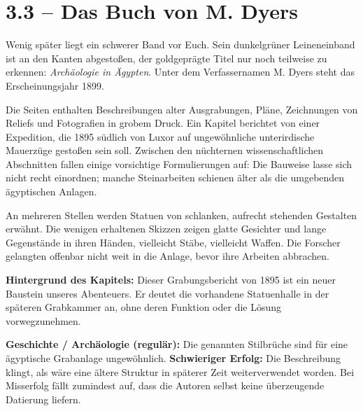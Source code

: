 \section{3.3 -- Das Buch von M. Dyers}
\begin{vorlesetextalle}
Wenig später liegt ein schwerer Band vor Euch. Sein dunkelgrüner Leineneinband ist an den Kanten abgesto\ss{}en, der goldgeprägte Titel nur noch teilweise zu erkennen: \emph{Archäologie in Ägypten}. Unter dem Verfassernamen M. Dyers steht das Erscheinungsjahr 1899.

Die Seiten enthalten Beschreibungen alter Ausgrabungen, Pläne, Zeichnungen von Reliefs und Fotografien in grobem Druck. Ein Kapitel berichtet von einer Expedition, die 1895 südlich von Luxor auf ungewöhnliche unterirdische Mauerzüge gesto\ss{}en sein soll. Zwischen den nüchternen wissenschaftlichen Abschnitten fallen einige vorsichtige Formulierungen auf: Die Bauweise lasse sich nicht recht einordnen; manche Steinarbeiten schienen älter als die umgebenden ägyptischen Anlagen.

An mehreren Stellen werden Statuen von schlanken, aufrecht stehenden Gestalten erwähnt. Die wenigen erhaltenen Skizzen zeigen glatte Gesichter und lange Gegenstände in ihren Händen, vielleicht Stäbe, vielleicht Waffen. Die Forscher gelangten offenbar nicht weit in die Anlage, bevor ihre Arbeiten abbrachen.
\end{vorlesetextalle}
\begin{meisterinfo}
\textbf{Hintergrund des Kapitels:} Dieser Grabungsbericht von 1895 ist ein neuer Baustein unseres Abenteuers. Er deutet die vorhandene Statuenhalle in der späteren Grabkammer an, ohne deren Funktion oder die Lösung vorwegzunehmen.

\textbf{Geschichte / Archäologie (regulär):} Die genannten Stilbrüche sind für eine ägyptische Grabanlage ungewöhnlich. \textbf{Schwieriger Erfolg:} Die Beschreibung klingt, als wäre eine ältere Struktur in späterer Zeit weiterverwendet worden. Bei Misserfolg fällt zumindest auf, dass die Autoren selbst keine überzeugende Datierung liefern.
\end{meisterinfo}

